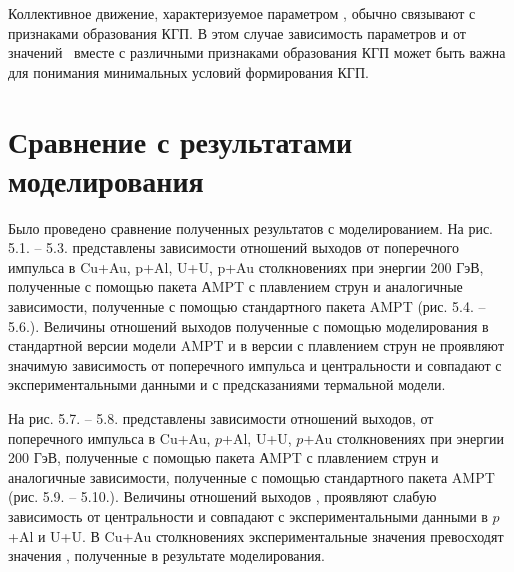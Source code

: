 \begin{comment}
\begin{figure}[ht]
	\centerfloat{
		\hfill
		\subcaptionbox{ }{%
			\texttt{[image: Results/ut\_Npart.png]}}
		\hfill
		\subcaptionbox{ }{%
			\texttt{[image: Results/ut\_Npart.png]}}
		\hfill
	}
	\caption{Зависимость а) температуры вымораживания $T_0$ и  б) скорости поперечного потока $u_T$ от количество нуклонов участников \Npart.}\label{fig:latex}
\end{figure}
\end{comment}
Коллективное движение, характеризуемое параметром \ut, обычно связывают с признаками образования КГП. В этом случае зависимость параметров \To и \ut от значений \Npart \ вместе с различными признаками образования КГП может быть важна для понимания минимальных условий формирования КГП.

\section{Сравнение с результатами моделирования} \label{sect5_spectra}

Было проведено сравнение полученных результатов с моделированием.
На рис. 5.1. – 5.3. представлены зависимости отношений выходов    от поперечного импульса  в Cu+Au, p+Al, U+U, p+Au столкновениях при энергии 200 ГэВ, полученные с помощью пакета АMPT с плавлением струн и аналогичные зависимости, полученные с помощью стандартного пакета AMPT (рис. 5.4. – 5.6.). Величины отношений выходов    полученные с помощью моделирования в стандартной версии модели AMPT и в версии с плавлением струн не проявляют значимую зависимость от поперечного импульса и центральности и совпадают с экспериментальными данными и с предсказаниями термальной модели.

На рис. 5.7. – 5.8. представлены зависимости отношений выходов,  от поперечного импульса  в Cu+Au, $p$+Al, U+U, $p$+Au столкновениях при энергии 200 ГэВ, полученные с помощью пакета АMPT с плавлением струн и аналогичные зависимости, полученные с помощью стандартного пакета AMPT (рис. 5.9. – 5.10.).  Величины отношений выходов , проявляют слабую зависимость от центральности и совпадают с экспериментальными данными в $p$+Al и U+U. В Cu+Au столкновениях экспериментальные значения  превосходят значения , полученные в результате моделирования.

